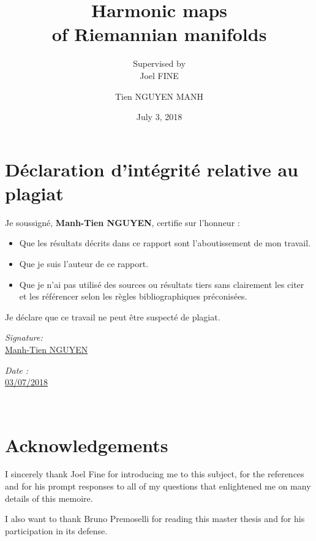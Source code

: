 \documentclass[12pt]{book}
\author{Tien NGUYEN MANH}
\date{July 3, 2018}
\title{Harmonic maps\\ of Riemannian manifolds}
\subtitle{Supervised by \\Joel FINE}
\begin{document}
\maketitle

\section*{Déclaration d’intégrité relative au plagiat}
\label{sec:declaration}
Je soussigné, \textbf{Manh-Tien NGUYEN}, certifie sur l'honneur :

\begin{itemize} 
\item Que les résultats décrits dans ce rapport sont l’aboutissement de mon travail.
\item Que je suis l’auteur de ce rapport.

\item   Que je n’ai pas utilisé des sources ou résultats tiers sans clairement les citer et les référencer selon les règles bibliographiques préconisées.

\end{itemize}
 Je déclare que ce travail ne peut être suspecté de plagiat.

 \vspace{2cm}

\begin{minipage}{0.5\textwidth}
\begin{flushleft}
\emph{Signature:}\\
\href{}{Manh-Tien NGUYEN} 
\end{flushleft}
\end{minipage}
\begin{minipage}{0.5\textwidth}
\begin{flushright}
\emph{Date :} \\
\href{}{03/07/2018} 
\end{flushright}
\end{minipage}\\[3cm]


\newpage

\section*{Acknowledgements}

I sincerely thank Joel Fine for introducing me to this subject, for the references and for his prompt responses to
all of my questions that enlightened me on many details of this memoire.

I also want to thank Bruno Premoselli for reading this master thesis and for his
participation in its defense.
\end{document}
